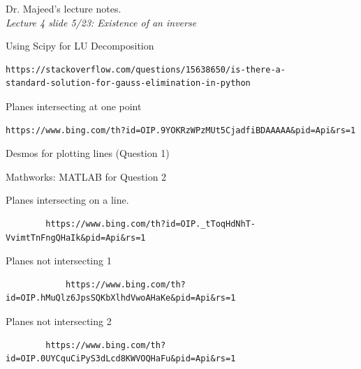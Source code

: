 \documentclass[a4paper, 11pt]{article}
\begin{document}
\begin{thebibliography}{9}
		Dr. Majeed's lecture notes. 
		\\ \textit{Lecture 4 slide 5/23: Existence of an inverse}

              Using Scipy for LU Decomposition
	   \begin{verbatim}
https://stackoverflow.com/questions/15638650/is-there-a-
standard-solution-for-gauss-elimination-in-python
		\end{verbatim}
       		Planes intersecting at one point
       		\begin{verbatim}
https://www.bing.com/th?id=OIP.9YOKRzWPzMUt5CjadfiBDAAAAA&pid=Api&rs=1
\end{verbatim}
       		
       		Desmos for plotting lines (Question 1)
        
        		Mathworks: MATLAB for Question 2
        
       		Planes intersecting on a line.
       		\begin{verbatim}
		https://www.bing.com/th?id=OIP._tToqHdNhT-VvimtTnFngQHaIk&pid=Api&rs=1
		\end{verbatim}
	
       		Planes not intersecting 1
       		\begin{verbatim}
			https://www.bing.com/th?id=OIP.hMuQlz6JpsSQKbXlhdVwoAHaKe&pid=Api&rs=1
		\end{verbatim}

       		Planes not intersecting 2
       		\begin{verbatim}
		https://www.bing.com/th?id=OIP.0UYCquCiPyS3dLcd8KWVOQHaFu&pid=Api&rs=1
		\end{verbatim}

\end{thebibliography}
\end{document}
